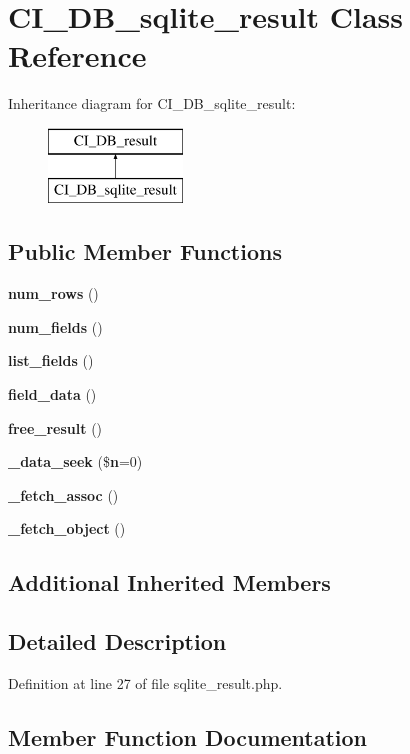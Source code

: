 \section{C\-I\-\_\-\-D\-B\-\_\-sqlite\-\_\-result Class Reference}
\label{class_c_i___d_b__sqlite__result}
Inheritance diagram for C\-I\-\_\-\-D\-B\-\_\-sqlite\-\_\-result\-:\begin{figure}[H]
\begin{center}
\leavevmode
\includegraphics[height=2.000000cm]{class_c_i___d_b__sqlite__result}
\end{center}
\end{figure}
\subsection*{Public Member Functions}
\begin{DoxyCompactItemize}
\item 
{\bf num\-\_\-rows} ()
\item 
{\bf num\-\_\-fields} ()
\item 
{\bf list\-\_\-fields} ()
\item 
{\bf field\-\_\-data} ()
\item 
{\bf free\-\_\-result} ()
\item 
{\bf \-\_\-data\-\_\-seek} (\${\bf n}=0)
\item 
{\bf \-\_\-fetch\-\_\-assoc} ()
\item 
{\bf \-\_\-fetch\-\_\-object} ()
\end{DoxyCompactItemize}
\subsection*{Additional Inherited Members}


\subsection{Detailed Description}


Definition at line 27 of file sqlite\-\_\-result.\-php.



\subsection{Member Function Documentation}
